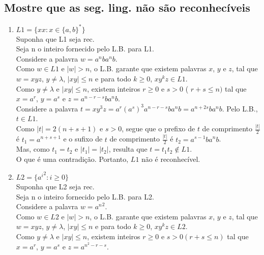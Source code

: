 \documentclass{article}
\begin{document}
\subsection{Mostre que as seg. ling. não são reconhecíveis}
    \begin{enumerate}
        \item $ L1 = \{xx: x \in \{a,b\}^* \} $\\
                Suponha que L1 seja rec.\\
                Seja n o inteiro fornecido pelo L.B. para L1.\\
                Considere a palavra $w = a^nba^nb $.\\
                Como $ w \in L1 $ e $ |w| > n $, o L.B. garante que existem palavras $x$, $y$ e $z$, tal que $ w = xyz $, $ y \neq \lambda $, $ |xy| \leq n $ e para todo $ k \geq 0 $, $ xy^kz \in L1 $.\\
                Como $ y \neq \lambda $ e $ |xy| \leq n $, existem inteiros $ r \geq 0 $ e $ s > 0 $ ( $ r + s \leq n ) $ tal que $ x = a^r $, $ y = a^s $ e $ z = a^{n-r-s}ba^nb $.\\
                Considere a palavra $ t = xy^3z = a^r(a^s)^3a^{n-r-s}ba^nb = a^{n+2s}ba^nb.$ Pelo L.B., $ t \in L1$.\\
                Como $ |t| = 2(n+s+1) $ e $ s > 0 $, segue que o prefixo de $ t $ de comprimento $ \frac{|t|}{2} $ é $t_1 = a^{n+s+1} $ e o sufixo de $ t $ de comprimento $ \frac{|t|}{2} $ é $ t_2 = a^{s-1}ba^nb$.\\
                Mas, como $ t_1 = t_2 $ e $ |t_1| = |t_2| $, resulta que $ t = t_1t_2 \notin L1 $.\\
                O que é uma contradição. Portanto, $ L1 $ não é reconhecível.
        \item $ L2 = \{ {a^i}^2 : i \geq 0 \} $ \\
                Suponha que L2 seja rec.\\
                Seja n o inteiro fornecido pelo L.B. para L2.\\
                Considere a palavra $w = {a^n}^2 $. \\
                Como $ w \in L2 $ e $ |w| > n $,  o L.B. garante que existem palavras $x$, $y$ e $z$, tal que $ w = xyz $, $ y \neq \lambda $, $ |xy| \leq n $ e para todo $ k \geq 0 $, $ xy^kz \in L2 $.\\
                Como $ y \neq \lambda $ e $ |xy| \leq n $, existem inteiros $ r \geq 0 $ e 
                    $s > 0 (r+s \leq n)$ tal que $ x = a^r $, $ y = a^s $ e $ z = a^{n^2-r-s} $.\\

\end{enumerate}
\end{document}

